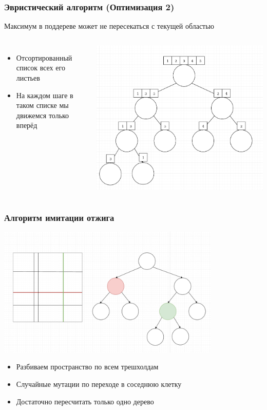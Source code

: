 \documentclass{beamer}
\begin{document}
\begin{frame}
    \frametitle{Эвристический алгоритм (Оптимизация 2)}
    Максимум в поддереве может не пересекаться с текущей областью

    \begin{columns}
            \begin{itemize}
                \item Отсортированный список всех его листьев
                \item На каждом шаге в таком списке мы движемся только вперёд
            \end{itemize}
            \includegraphics[width=1.1\textwidth]{merge.png}
    \end{columns}
\end{frame}

\begin{frame}
\frametitle{Алгоритм имитации отжига}
    \begin{center}
    \includegraphics[width=0.8\textwidth]{gena.png}
    \end{center}
    \begin{itemize}
        \item Разбиваем пространство по всем трешхолдам
        \item Случайные мутации по переходе в соседнюю клетку
        \item Достаточно пересчитать только одно дерево
    \end{itemize}
\end{frame}
\end{document}
